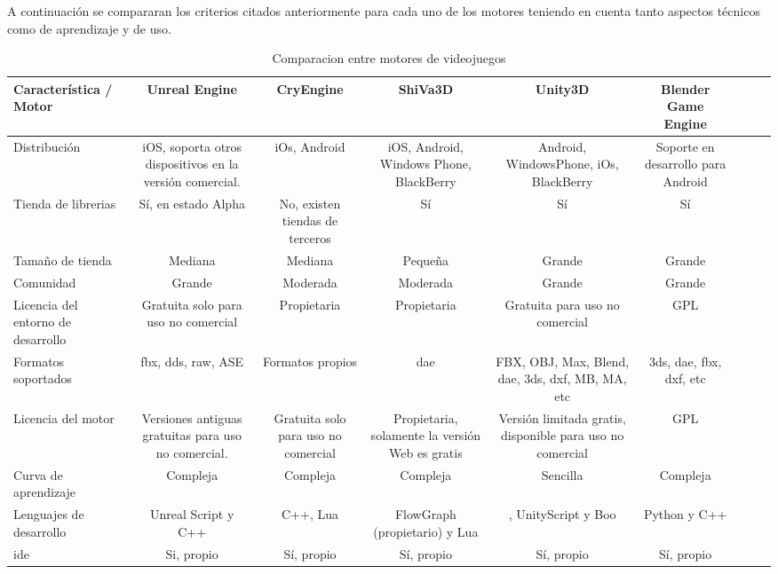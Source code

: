 A continuación se compararan los criterios citados anteriormente para cada uno de los
motores teniendo en cuenta tanto aspectos técnicos como de aprendizaje y de uso.



\begin{sidewaystable}
\begin{tabulary}{\textwidth}{L|CCCCCCCC}
\toprule
Característica / Motor &
Unreal Engine          &
CryEngine              &
ShiVa3D                &
Unity3D                &
Blender Game Engine \\
\midrule
Distribución & iOS, soporta otros dispositivos en la versión comercial. &
iOs, Android & iOS, Android, Windows Phone, BlackBerry & Android, WindowsPhone,
iOs, BlackBerry & Soporte en desarrollo para Android \\ 

Tienda de librerias & Sí, en estado Alpha & No, existen tiendas de
terceros & Sí & Sí & Sí \\

Tamaño de tienda & Mediana & Mediana & Pequeña & Grande & Grande \\

Comunidad & Grande & Moderada & Moderada & Grande & Grande \\
Licencia del entorno de desarrollo & Gratuita solo para uso no comercial &
Propietaria & Propietaria & Gratuita para uso no comercial & GPL \\

Formatos soportados & fbx, dds, raw, ASE & Formatos propios & dae & FBX, OBJ,
Max, Blend, dae, 3ds, dxf, MB, MA, etc & 3ds, dae, fbx, dxf, etc \\

Licencia del motor & Versiones antiguas gratuitas para uso no comercial.
& Gratuita solo para uso no comercial & Propietaria, solamente la versión Web es
gratis & Versión limitada gratis, disponible para uso no comercial & GPL \\

Curva de aprendizaje & Compleja & Compleja & Compleja & Sencilla & Compleja \\

Lenguajes de desarrollo & Unreal Script y C++ & C++, Lua & FlowGraph
(propietario) y Lua & \cs{}, UnityScript y Boo & Python y C++ \\

\Gls{ide} & Si, propio & Sí, propio & Sí, propio & Sí, propio & Sí, propio \\
\bottomrule

\end{tabulary}
\caption{Comparacion entre motores de videojuegos}
\label{tab:comparacion_motores_juegos}
\end{sidewaystable}

